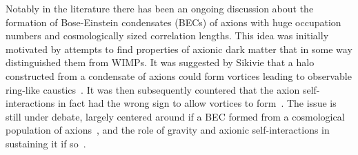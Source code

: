 Notably in the literature there has been an ongoing discussion about the formation of Bose-Einstein condensates (BECs) of axions with huge occupation numbers and cosmologically sized correlation lengths. This idea was initially motivated by attempts to find properties of axionic dark matter that in some way distinguished them from WIMPs. It was suggested by Sikivie that a halo constructed from a condensate of axions could form vortices leading to observable ring-like caustics~\cite{Sikivie:2009qn,Erken:2011dz}. It was then subsequently countered that the axion self-interactions in fact had the wrong sign to allow vortices to form~\cite{RindlerDaller:2011kx}. The issue is still under debate, largely centered around if a BEC formed from a cosmological population of axions~\cite{Davidson:2014hfa}, and the role of gravity and axionic self-interactions in sustaining it if so~\cite{Guth:2014hsa,Davidson:2013aba}.
 

